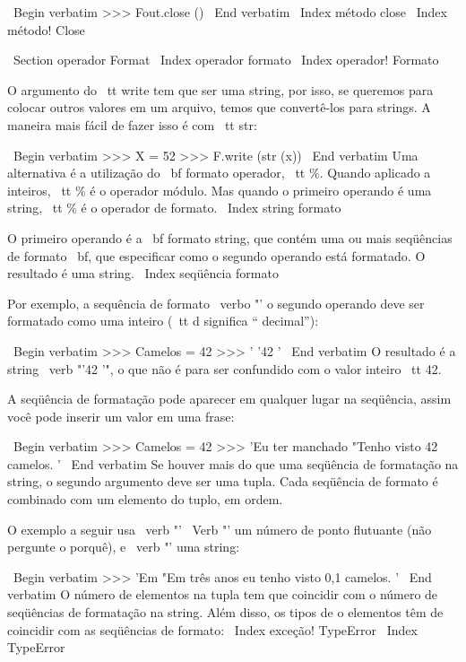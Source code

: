 \documentclass[10pt]{book}
\begin{document}
{{{{{{{{{{\ Begin {verbatim}
>>> Fout.close ()
\ End {verbatim}
%
\ Index {método close}
\ Index {método! Close}


\ Section {operador Format}
\ Index {operador formato}
\ Index {operador! Formato}

O argumento do {\ tt write} tem que ser uma string, por isso, se queremos
para colocar outros valores em um arquivo, temos que convertê-los para
strings. A maneira mais fácil de fazer isso é com {\ tt str}:

\ Begin {verbatim}
>>> X = 52
>>> F.write (str (x))
\ End {verbatim}
%
Uma alternativa é a utilização do {\ bf formato operador}, {\ tt \%}. Quando
aplicado a inteiros, {\ tt \%} é o operador módulo. Mas
quando o primeiro operando é uma string, {\ tt \%} é o operador de formato.
\ Index {string formato}

O primeiro operando é a {\ bf formato string}, que contém
uma ou mais seqüências de formato {\ bf}, que
especificar como
o segundo operando está formatado. O resultado é uma string.
\ Index {seqüência formato}

Por exemplo, a sequência de formato \ verbo "'%
o segundo operando deve ser formatado como uma
inteiro ({\ tt d} significa `` decimal''):

\ Begin {verbatim}
>>> Camelos = 42
>>> '%
'42 '
\ End {verbatim}
%
O resultado é a string \ verb "'42 '", o que não é para ser confundido
com o valor inteiro {\ tt 42}.

A seqüência de formatação pode aparecer em qualquer lugar na seqüência,
assim você pode inserir um valor em uma frase:

\ Begin {verbatim}
>>> Camelos = 42
>>> 'Eu ter manchado%
"Tenho visto 42 camelos. '
\ End {verbatim}
%
Se houver mais do que uma seqüência de formatação na string,
o segundo argumento deve ser uma tupla. Cada seqüência de formato é
combinado com um elemento do tuplo, em ordem.

O exemplo a seguir usa \ verb "'%
\ Verb "'%
um número de ponto flutuante (não pergunte o porquê), e \ verb "'%
uma string:

\ Begin {verbatim}
>>> 'Em%
"Em três anos eu tenho visto 0,1 camelos. '
\ End {verbatim}
%
O número de elementos na tupla tem que coincidir com o número
de seqüências de formatação na string. Além disso, os tipos de o
elementos têm de coincidir com as seqüências de formato:
\ Index {exceção! TypeError}
\ Index {} TypeError

}}}}}}}}}}
\end{document}
